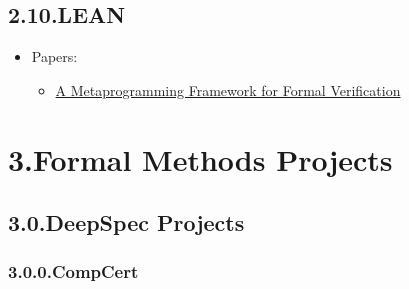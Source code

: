 \documentclass[12pt,twoside]{article}
\begin{document}
\subsection{2.10.\hspace*{0.5em}LEAN}\label{sec-lean}%

\begin{itemize}[noitemsep,topsep=\mdcompacttopsep]%

\item{}Papers:

\begin{itemize}[noitemsep,topsep=\mdcompacttopsep]%

\item{}\href{https://pp.ipd.kit.edu/uploads/publikationen/ebner17meta.pdf}{A Metaprogramming Framework for Formal Verification}%
\end{itemize}%
\end{itemize}%

\section{3.\hspace*{0.5em}Formal Methods Projects}\label{sec-formal-methods-projects}%

\subsection{3.0.\hspace*{0.5em}DeepSpec Projects}\label{sec-deepspec-projects}%

\subsubsection{3.0.0.\hspace*{0.5em}CompCert}\label{sec-compcert}%
\end{document}

